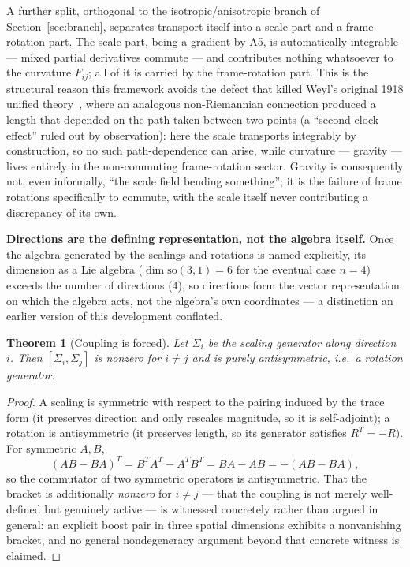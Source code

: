 \documentclass[aps,prd,twocolumn,superscriptaddress,nofootinbib]{revtex4-2}
\newtheorem{theorem}{Theorem}
\begin{document}
A further split, orthogonal to the isotropic/anisotropic branch of
Section~\ref{sec:branch}, separates transport itself into a scale part
and a frame-rotation part. The scale part, being a gradient by A5, is
automatically integrable — mixed partial derivatives commute — and
contributes nothing whatsoever to the curvature $F_{ij}$; all of it is
carried by the frame-rotation part. This is the structural reason this
framework avoids the defect that killed Weyl's original 1918 unified
theory~\cite{Weyl1918}, where an analogous non-Riemannian connection
produced a length that depended on the path taken between two points (a
``second clock effect'' ruled out by observation): here the scale
transports integrably by construction, so no such path-dependence can
arise, while curvature — gravity — lives entirely in the
non-commuting frame-rotation sector. Gravity is consequently not, even
informally, ``the scale field bending something''; it is the failure of
frame rotations specifically to commute, with the scale itself never
contributing a discrepancy of its own.

\textbf{Directions are the defining representation, not the algebra
itself.} Once the algebra generated by the scalings and rotations is
named explicitly, its dimension as a Lie algebra ($\dim\mathrm{so}(3,1)=6$
for the eventual case $n=4$) exceeds the number of directions ($4$), so
directions form the vector representation on which the algebra acts, not
the algebra's own coordinates — a distinction an earlier version of this
development conflated.

\begin{theorem}[Coupling is forced]\label{thm:coupling}
Let $\Sigma_i$ be the scaling generator along direction $i$. Then
$[\Sigma_i,\Sigma_j]$ is nonzero for $i\neq j$ and is purely
antisymmetric, i.e.\ a rotation generator.
\end{theorem}
\begin{proof}
A scaling is symmetric with respect to the pairing induced by the trace
form (it preserves direction and only rescales magnitude, so it is
self-adjoint); a rotation is antisymmetric (it preserves length, so its
generator satisfies $R^T = -R$). For symmetric $A,B$,
\[
(AB-BA)^T = B^TA^T - A^TB^T = BA - AB = -(AB-BA),
\]
so the commutator of two symmetric operators is antisymmetric. That the
bracket is additionally \emph{nonzero} for $i\neq j$ — that the coupling
is not merely well-defined but genuinely active — is witnessed concretely
rather than argued in general: an explicit boost pair in three spatial
dimensions exhibits a nonvanishing bracket, and no general
nondegeneracy argument beyond that concrete witness is claimed.
\end{proof}
\end{document}
